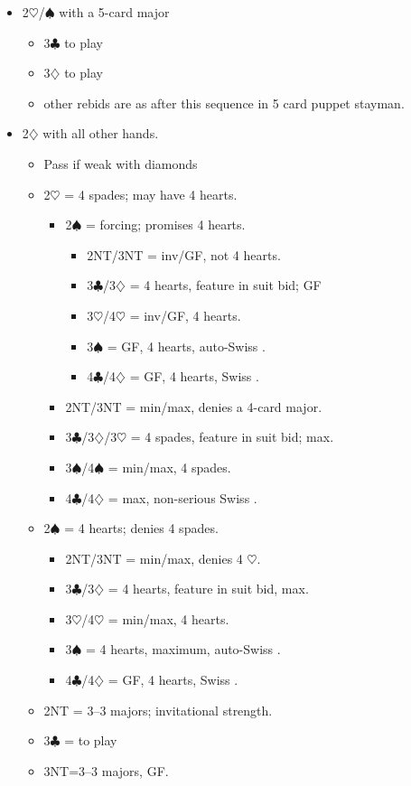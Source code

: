 \documentclass[a4paper,14pt]{extarticle}
\begin{document}
	\begin{itemize}
	\item 2$\heartsuit$/$\spadesuit$ with a 5-card major
		\begin{itemize}
		\item 3$\clubsuit$ to play
		\item 3$\diamondsuit$ to play
		\item other rebids are as after this sequence in 5 card puppet stayman.
		\end{itemize}
	\item 2$\diamondsuit$ with all other hands. 
		\begin{itemize}
		\item Pass if weak with diamonds
		\item 2$\heartsuit$ = 4 spades; may have 4 hearts.
			\begin{itemize}
			\item 2$\spadesuit$ = forcing; promises 4 hearts.
				\begin{itemize}
				\item 2NT/3NT = inv/GF, not 4 hearts.
				\item 3$\clubsuit$/3$\diamondsuit$ = 4 hearts, feature in suit bid; GF
				\item 3$\heartsuit$/4$\heartsuit$ = inv/GF, 4 hearts.
				\item 3$\spadesuit$ = GF, 4 hearts, auto-Swiss .
				\item 4$\clubsuit$/4$\diamondsuit$ = GF, 4 hearts, Swiss .
				\end{itemize}
			\item 2NT/3NT = min/max, denies a 4-card major.
			\item 3$\clubsuit$/3$\diamondsuit$/3$\heartsuit$ = 4 spades, feature in suit bid; max.
			\item 3$\spadesuit$/4$\spadesuit$ = min/max, 4 spades.
			\item 4$\clubsuit$/4$\diamondsuit$ = max, non-serious Swiss .
			\end{itemize}

		\item 2$\spadesuit$ = 4 hearts; denies 4 spades.
			\begin{itemize}
			\item 2NT/3NT = min/max, denies 4 $\heartsuit$.
			\item 3$\clubsuit$/3$\diamondsuit$ = 4 hearts, feature in suit bid, max.
			\item 3$\heartsuit$/4$\heartsuit$ = min/max, 4 hearts.
			\item 3$\spadesuit$ = 4 hearts, maximum, auto-Swiss .
			\item 4$\clubsuit$/4$\diamondsuit$ = GF, 4 hearts, Swiss .
			\end{itemize}

		\item 2NT = 3--3 majors; invitational strength.
		\item 3$\clubsuit$ = to play
		\item 3NT=3--3 majors, GF.
		\end{itemize}
	\end{itemize}
\end{document}
